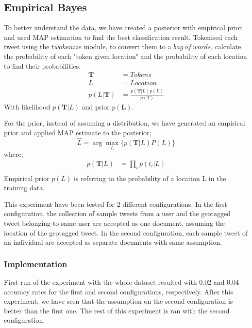 \documentclass[twoside,11pt]{article}
\begin{document}
\subsection{Empirical Bayes}
To better understand the data, we have created a posterior with empirical prior\cite{carlin1997bayes} and used MAP estimation\cite{degrooth} to find the best classification result. Tokenised each tweet using the $twokenize$ module\cite{gimpel2011part}, to convert them to a $bag\ of\ words$, calculate the probability of each "token given location" and the probability of each location to find their probabilities. 
\begin{equation*}
\begin{split}
\mathbf{T} &= Tokens \\
L &= Location \\
p(L|\mathbf{T}) &= \frac{p(\mathbf{T} | L)p(L)}{p(T)}
\end{split}
\end{equation*}
With likelihood $p(\mathbf{T} | L)$ and prior $p(\mathbf{L})$. 

For the prior, instead of assuming a distribution, we have generated an empirical prior and applied MAP estimate to the posterior;
\begin{equation*}
\hat{L} = \arg\max_L\{p(\mathbf{T} | L) P(L)\}
\end{equation*}
where;
\begin{equation*}
\begin{split}
p(\mathbf{T} | L) &= \prod_i{p(t_i|L)}\\
\end{split}
\end{equation*}
Empirical prior $p(L)$ is referring to the probability of a location L in the training data.

This experiment have been tested for 2 different configurations. In the first configuration, the collection of sample tweets from a user and the geotagged tweet belonging to same user are accepted as one document, assuming the location of the geotagged tweet. In the second configuration, each sample tweet of an individual are accepted as separate documents with same assumption. 

\subsubsection{Implementation}
First run of the experiment with the whole dataset resulted with 0.02 and 0.04 accuracy rates for the first and second configurations, respectively. After this experiment, we have seen that the assumption on the second configuration is better than the first one. The rest of this experiment is ran with the second configuration.
\end{document}
